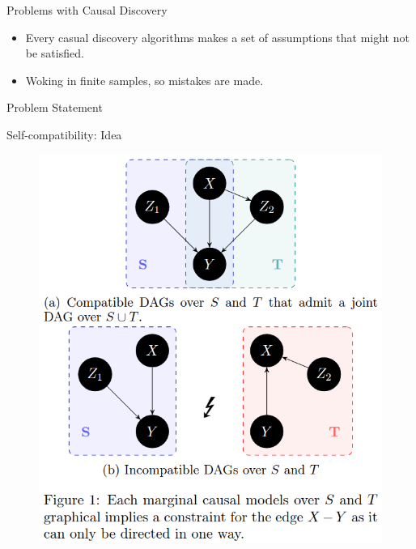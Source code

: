 \documentclass{beamer}
\begin{document}
\begin{frame}{Problems with Causal Discovery}
	\begin{itemize}
		\item Every casual discovery algorithms makes a set of assumptions that might not be satisfied.
		\item Woking in finite samples, so mistakes are made.
	\end{itemize}
\end{frame}

\begin{frame}{Problem Statement}
\end{frame}

\begin{frame}{Self-compatibility: Idea}
	\begin{figure}
		\centering
		\includegraphics[scale=0.3]{imgs/example.png}
	\end{figure}
\end{frame}
\end{document}
